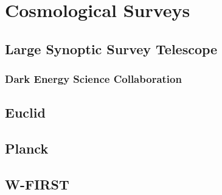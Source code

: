 \chapter{Cosmological Surveys}

\section{Large Synoptic Survey Telescope}

\subsection{Dark Energy Science Collaboration}

\section{Euclid}

\section{Planck}
\cite{Planck_cosmo_param}

\section{W-FIRST}

